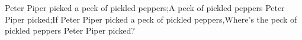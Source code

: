 Peter Piper picked a peck of pickled peppers;A peck of pickled peppers Peter Piper picked;If Peter Piper picked a peck of pickled peppers,Where’s the peck of pickled peppers Peter Piper picked?